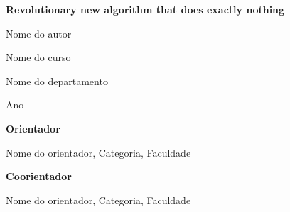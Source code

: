\documentclass{article}
\begin{document}

\begin{flushleft}
\HUGE \textbf{Revolutionary new algorithm that does exactly nothing}

\vspace{5mm}

\LARGE Nome do autor

\large Nome do curso

\normalsize Nome do departamento

\normalsize Ano

\vspace{5mm}


\textbf{Orientador}

Nome do orientador, Categoria, Faculdade

\vspace{5mm}

\textbf{Coorientador}

Nome do orientador, Categoria, Faculdade

\end{flushleft}
\vfill
\end{document}
